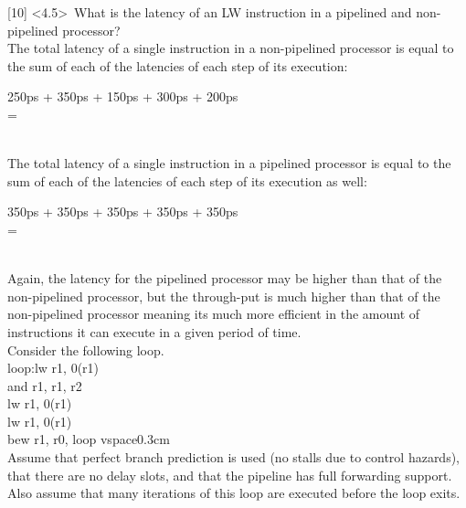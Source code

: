 \documentclass[12pt]{article}
\begin{document}
	\noindent {} 
	[10] \textless4.5\textgreater \ What is the latency of an LW instruction in a pipelined and non-pipelined processor? \vspace{0.2cm} \\
	
	The total latency of a single instruction in a non-pipelined processor is equal to the sum of each of the latencies of each step of its execution: \\
	
	\begin{center}
		250ps + 350ps + 150ps + 300ps + 200ps \\
		= \\
		 \vspace{0.2cm}\\
	\end{center}
	
	The total latency of a single instruction in a pipelined processor is equal to the sum of each of the latencies of each step of its execution as well: \\
	
	\begin{center}
		350ps + 350ps + 350ps + 350ps + 350ps  \\
		= \\
		 \vspace{0.1cm} \\
	\end{center}
	
	Again, the latency for the pipelined processor may be higher than that of the non-pipelined processor, but the through-put is much higher than that of the non-pipelined processor meaning its much more efficient in the amount of instructions it can execute in a given period of time. \vspace{0.8cm} \\
	
	\noindent {} 
	Consider the following loop. \\
	loop:lw r1, 0(r1) \\
	and r1, r1, r2 \\
	lw r1, 0(r1) \\
	lw r1, 0(r1) \\
	bew r1, r0, loop vspace{0.3cm}\\
	
	\noindent Assume that perfect branch prediction is used (no stalls due to control hazards), that there are no delay slots, and that the pipeline has full forwarding support. Also assume that many iterations of this loop are executed before the loop exits. \vspace{0.3cm} \\
	
\end{document}
